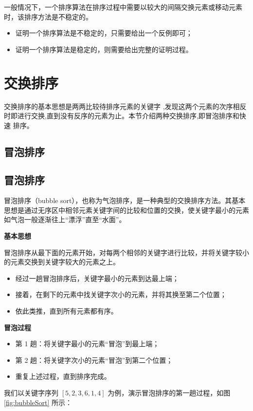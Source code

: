 \documentclass[lang=cn,newtx,10pt,scheme=chinese]{elegantbook}
\begin{document}
一般情况下，一个排序算法在排序过程中需要以较大的间隔交换元素或移动元素时，该排序方法是不稳定的。  
\begin{itemize}
  \item 证明一个排序算法是不稳定的，只需要给出一个反例即可；
  \item 证明一个排序算法是稳定的，则需要给出完整的证明过程。
\end{itemize}

\section{交换排序}
交换排序的基本思想是两两比较待排序元素的关键字 ,发现这两个元素的次序相反
时即进行交换,直到没有反序的元素为止。本节介绍两种交换排序,即冒泡排序和快速
排序。

\subsection{冒泡排序}
\subsection{冒泡排序}

冒泡排序（bubble sort），也称为气泡排序，是一种典型的交换排序方法。其基本思想是通过无序区中相邻元素关键字间的比较和位置的交换，使关键字最小的元素如气泡一般逐渐往上“漂浮”直至“水面”。


\textbf{基本思想}  

冒泡排序从最下面的元素开始，对每两个相邻的关键字进行比较，并将关键字较小的元素交换到关键字较大的元素之上。  
\begin{itemize}
  \item 经过一趟冒泡排序后，关键字最小的元素到达最上端；
  \item 接着，在剩下的元素中找关键字次小的元素，并将其换至第二个位置；
  \item 依此类推，直到所有元素都有序。
\end{itemize}

\textbf{冒泡过程}  

\begin{itemize}
  \item 第 1 趟：将关键字最小的元素“冒泡”到最上端；
  \item 第 2 趟：将关键字次小的元素“冒泡”到第二个位置；
  \item 重复上述过程，直到排序完成。
\end{itemize}

我们以关键字序列 $[5, 2, 3,6,1,4]$ 为例，演示冒泡排序的第一趟过程，如图 \ref{fig:bubbleSort} 所示：
\end{document}

